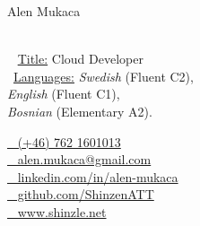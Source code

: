 \begin{minipage}[t]{0.4\textwidth}
    \vspace{0pt} %
    {\par\centering\huge{Alen Mukaca}} \\[0.3cm]

    {\small
    \faGraduationCap~ \underline{Title:} Cloud Developer \\
    \faCommentsO~\underline{Languages:} \emph{Swedish} (Fluent C2), \\ \emph{English} (Fluent C1), \\ \emph{Bosnian} (Elementary A2).}
\end{minipage}\hfill
\begin{minipage}[t]{0.55\textwidth}
    \vspace{0pt} %
    \href{tel:+46762160103}{\faPhone~ (+46) 762 1601013} \\
    \href{mailto:alen.mukaca@gmail.com}{\faEnvelopeO~ \protect alen.mukaca@gmail.com} \\[0.1cm]

    \href{https://linkedin.com/in/alen-mukaca/}{\faLinkedin~ \protect linkedin.com/in/alen-mukaca} \\
    \href{https://github.com/ShinzenATT}{\faGithub~ \protect github.com/ShinzenATT} \\
    \href{https://shinzle.net}{\faGlobe~ \protect www.shinzle.net}
\end{minipage}
